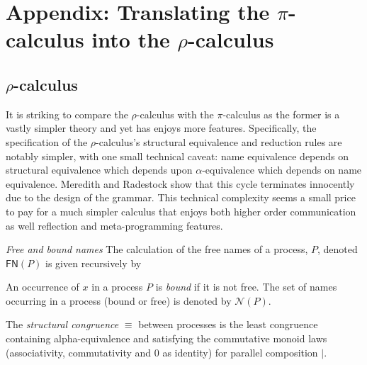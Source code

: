 \documentclass{llncs}
\newcommand{\pic}{$\pi$-calculus}
\newcommand{\pzero}{\mathbin{0}}
\newcommand{\names}[1]{\mathbin{\mathcal{N}(#1)}}
\newcommand{\freenames}[1]{\mathbin{\mathsf{FN}(#1)}}
\newcommand{\bc}{\mathbin{\mathbf{::=}}}
\newcommand{\bm}{\mathbin{\mathbf\mid}}
\newcommand{\rhoc}{$\rho$-calculus}
\begin{document}



\section{Appendix: Translating the {\pic} into the {\rhoc}}
\subsection{\rhoc}

It is striking to compare the {\rhoc} with the {\pic} as the former is
a vastly simpler theory and yet has enjoys more
features. Specifically, the specification of the {\rhoc}'s structural
equivalence and reduction rules are notably simpler, with one small
technical caveat: name equivalence depends on structural equivalence
which depends upon $\alpha$-equivalence which depends on name
equivalence. Meredith and Radestock show that this cycle terminates
innocently due to the design of the grammar. This technical complexity
seems a small price to pay for a much simpler calculus that enjoys
both higher order communication as well reflection and meta-programming
features.


\begin{definition}
\emph{Free and bound names} The calculation of the free names of a
process, $P$, denoted $\freenames{P}$ is given recursively by


An occurrence of $x$ in a process $P$ is \textit{bound} if it is not
free. The set of names occurring in a process (bound or free) is
denoted by $\names{P}$.
\end{definition}

\begin{definition}
  The {\em structural congruence} $\equiv$
  between processes \cite{SangiorgiWalker} is the least congruence containing
  alpha-equivalence and satisfying the commutative monoid laws
  (associativity, commutativity and $\pzero$ as identity) for parallel
  composition $|$.
\end{definition}
\end{document}
